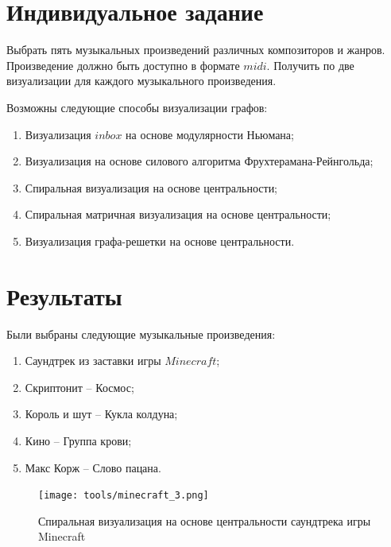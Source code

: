 \documentclass{article}
\begin{document}
\clearpage\section{Индивидуальное задание}

Выбрать пять музыкальных произведений различных композиторов и жанров. Произведение должно быть доступно в формате 
$midi$. Получить по две визуализации для каждого музыкального произведения. 

Возможны следующие способы визуализации графов:
\begin{enumerate}
	\item Визуализация $inbox$ на основе модулярности Ньюмана;
	\item Визуализация на основе силового алгоритма Фрухтерамана-Рейнгольда;
	\item Спиральная визуализация на основе центральности;
	\item Спиральная матричная визуализация на основе центральности;
	\item Визуализация графа-решетки на основе центральности.
\end{enumerate}


\clearpage\section{Результаты}

Были выбраны следующие музыкальные произведения:
\begin{enumerate}
	\item Саундтрек из заставки игры $Minecraft$;
	\item Скриптонит -- Космос;
	\item Король и шут -- Кукла колдуна;
	\item Кино -- Группа крови;
	\item Макс Корж -- Слово пацана.
\end{enumerate}

\begin{figure}[h]
	\centering
	\texttt{[image: tools/minecraft\_3.png]}
	\caption{Спиральная визуализация на основе центральности саундтрека игры Minecraft}
\end{figure}
\end{document}
